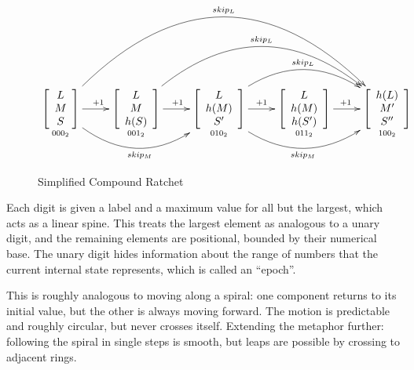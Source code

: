 \documentclass{article}
\begin{document}
	\begin{figure}[h]
		\centering
		
		$\xymatrix{
		    \underset{000_{2}}{\left[ { \begin{array}{cc} L \\ M  \\ S \end{array} } \right]}
				\ar[r]^{+1}
				\ar@/_3pc/[rr]_{skip_{M}}
				\ar@/^7pc/[rrrr]^{skip_{L}}
    	 & \underset{001_{2}}{\left[ { \begin{array}{cc} L \\ M  \\ h(S) \end{array} } \right]}
	      		\ar[r]^{+1}
	      		\ar@/^4.75pc/[rrr]^{skip_{L}}
	     & \underset{010_{2}}{\left[ { \begin{array}{cc} L \\ h(M)  \\ S' \end{array} } \right]}
	      		\ar[r]^{+1}
	      		\ar@/_3pc/[rr]_{skip_{M}}
	      		\ar@/^3pc/[rr]^{skip_{L}}
    	 & \underset{011_{2}}{\left[ { \begin{array}{cc} L \\ h(M)  \\ h(S') \end{array} } \right]}
	      		\ar[r]^{+1}
	     & \underset{100_{2}}{\left[ { \begin{array}{cc} h(L) \\ M'  \\ S'' \end{array} } \right]}
		}$

		\caption{Simplified Compound Ratchet}
		\label{fig:compound-ratchet}
	\end{figure}

	Each digit is given a label and a maximum value for all but the largest, which acts as a linear spine. This treats the largest element as analogous to a unary digit, and the remaining elements are positional, bounded by their numerical base. The unary digit hides information about the range of numbers that the current internal state represents, which is called an ``epoch''.
	
	This is roughly analogous to moving along a spiral: one component returns to its initial value, but the other is always moving forward. The motion is predictable and roughly circular, but never crosses itself. Extending the metaphor further: following the spiral in single steps is smooth, but leaps are possible by crossing to adjacent rings.
	
\end{document}
